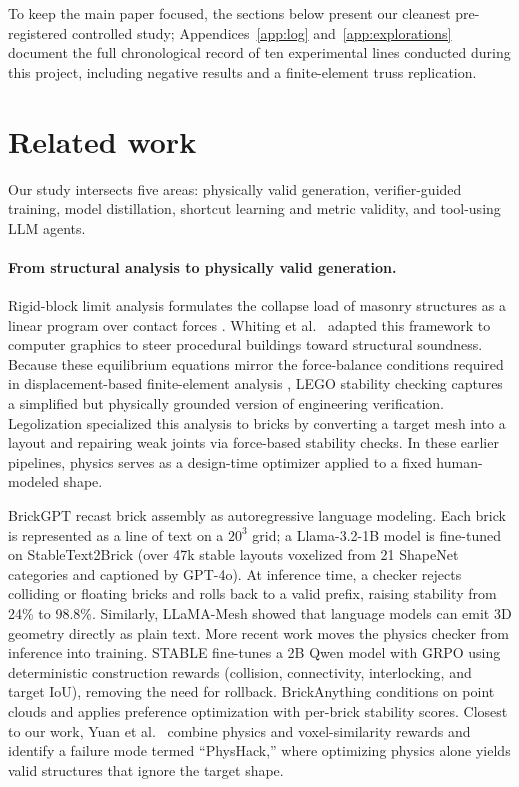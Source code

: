 \documentclass{article}
\begin{document}
To keep the main paper focused, the sections below present our cleanest pre-registered controlled study; Appendices~\ref{app:log} and~\ref{app:explorations} document the full chronological record of ten experimental lines conducted during this project, including negative results and a finite-element truss replication.

\section{Related work}
\label{sec:related}
Our study intersects five areas: physically valid generation, verifier-guided training, model distillation, shortcut learning and metric validity, and tool-using LLM agents.

\paragraph{From structural analysis to physically valid generation.}
Rigid-block limit analysis formulates the collapse load of masonry structures as a linear program over contact forces \cite{livesley1978}. Whiting et al.\ \cite{whiting2009} adapted this framework to computer graphics to steer procedural buildings toward structural soundness. Because these equilibrium equations mirror the force-balance conditions required in displacement-based finite-element analysis \cite{zienkiewicz2005fem}, LEGO stability checking captures a simplified but physically grounded version of engineering verification. Legolization \cite{luo2015legolization} specialized this analysis to bricks by converting a target mesh into a layout and repairing weak joints via force-based stability checks. In these earlier pipelines, physics serves as a design-time optimizer applied to a fixed human-modeled shape.

BrickGPT \cite{pun2025brickgpt} recast brick assembly as autoregressive language modeling. Each brick is represented as a line of text on a $20^3$ grid; a Llama-3.2-1B model is fine-tuned on StableText2Brick (over 47k stable layouts voxelized from 21 ShapeNet categories \cite{chang2015shapenet} and captioned by GPT-4o). At inference time, a checker rejects colliding or floating bricks and rolls back to a valid prefix, raising stability from 24\% to 98.8\%. Similarly, LLaMA-Mesh \cite{wang2024llamamesh} showed that language models can emit 3D geometry directly as plain text. More recent work moves the physics checker from inference into training. STABLE \cite{stable2026} fine-tunes a 2B Qwen model with GRPO using deterministic construction rewards (collision, connectivity, interlocking, and target IoU), removing the need for rollback. BrickAnything \cite{ni2026brickanything} conditions on point clouds and applies preference optimization with per-brick stability scores. Closest to our work, Yuan et al.\ \cite{pvpo2026} combine physics and voxel-similarity rewards and identify a failure mode termed ``PhysHack,'' where optimizing physics alone yields valid structures that ignore the target shape.
\end{document}
